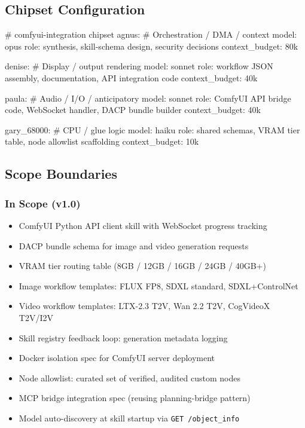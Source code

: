 \documentclass[11pt,letterpaper]{article}
\begin{document}
\subsection{Chipset Configuration}

\begin{asciibox}
# comfyui-integration chipset
agnus:           # Orchestration / DMA / context
  model: opus
  role: synthesis, skill-schema design, security decisions
  context_budget: 80k

denise:          # Display / output rendering
  model: sonnet
  role: workflow JSON assembly, documentation, API integration code
  context_budget: 40k

paula:           # Audio / I/O / anticipatory
  model: sonnet
  role: ComfyUI API bridge code, WebSocket handler, DACP bundle builder
  context_budget: 40k

gary_68000:      # CPU / glue logic
  model: haiku
  role: shared schemas, VRAM tier table, node allowlist scaffolding
  context_budget: 10k
\end{asciibox}

\subsection{Scope Boundaries}

\subsubsection{In Scope (v1.0)}
\begin{itemize}[leftmargin=1.5em]
  \item ComfyUI Python API client skill with WebSocket progress tracking
  \item DACP bundle schema for image and video generation requests
  \item VRAM tier routing table (8GB / 12GB / 16GB / 24GB / 40GB+)
  \item Image workflow templates: FLUX FP8, SDXL standard, SDXL+ControlNet
  \item Video workflow templates: LTX-2.3 T2V, Wan 2.2 T2V, CogVideoX T2V/I2V
  \item Skill registry feedback loop: generation metadata logging
  \item Docker isolation spec for ComfyUI server deployment
  \item Node allowlist: curated set of verified, audited custom nodes
  \item MCP bridge integration spec (reusing planning-bridge pattern)
  \item Model auto-discovery at skill startup via \texttt{GET /object\_info}
\end{itemize}
\end{document}
